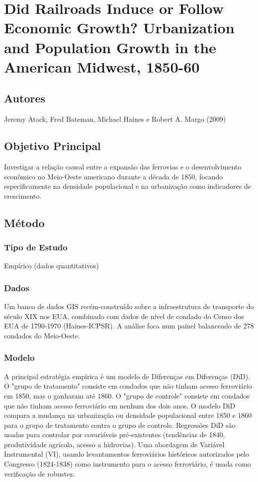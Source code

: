 \documentclass[12pt]{article}
\begin{document}
\section{Did Railroads Induce or Follow Economic Growth? Urbanization and Population Growth in the American Midwest, 1850-60}

\subsection*{Autores}
Jeremy Atack, Fred Bateman, Michael Haines e Robert A. Margo (2009)

\subsection*{Objetivo Principal}
Investigar a relação causal entre a expansão das ferrovias e o desenvolvimento econômico no Meio-Oeste americano durante a década de 1850, focando especificamente na densidade populacional e na urbanização como indicadores de crescimento.

\subsection*{Método}

\subsubsection*{Tipo de Estudo}
Empírico (dados quantitativos)

\subsubsection*{Dados}
Um banco de dados GIS recém-construído sobre a infraestrutura de transporte do século XIX nos EUA, combinado com dados de nível de condado do Censo dos EUA de 1790-1970 (Haines-ICPSR). A análise foca num painel balanceado de 278 condados do Meio-Oeste.

\subsubsection*{Modelo}
A principal estratégia empírica é um modelo de Diferenças em Diferenças (DiD). O "grupo de tratamento" consiste em condados que não tinham acesso ferroviário em 1850, mas o ganharam até 1860. O "grupo de controle" consiste em condados que não tinham acesso ferroviário em nenhum dos dois anos. O modelo DiD compara a mudança na urbanização ou densidade populacional entre 1850 e 1860 para o grupo de tratamento contra o grupo de controle. Regressões DiD são usadas para controlar por covariáveis pré-existentes (tendências de 1840, produtividade agrícola, acesso a hidrovias). Uma abordagem de Variável Instrumental (VI), usando levantamentos ferroviários históricos autorizados pelo Congresso (1824-1838) como instrumento para o acesso ferroviário, é usada como verificação de robustez.
\end{document}
